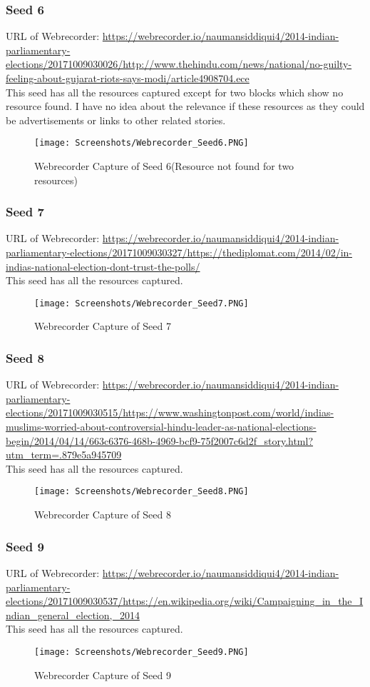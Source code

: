 \documentclass[11pt,journal,compsoc,onecolumn]{IEEEtran}
\begin{document}
\subsubsection{Seed 6}
URL of Webrecorder: 
\url{https://webrecorder.io/naumansiddiqui4/2014-indian-parliamentary-elections/20171009030026/http://www.thehindu.com/news/national/no-guilty-feeling-about-gujarat-riots-says-modi/article4908704.ece}\\
This seed has all the resources captured except for two blocks which show no resource found. I have no idea about the relevance if these resources as they could be advertisements or links to other related stories. 
 \begin{figure}[ht] 
  \centering
  \texttt{[image: Screenshots/Webrecorder\_Seed6.PNG]}
  \caption{Webrecorder Capture of Seed 6(Resource not found for two resources)}
  \label{fig:9}
\end{figure}
\subsubsection{Seed 7}
URL of Webrecorder: 
\url{https://webrecorder.io/naumansiddiqui4/2014-indian-parliamentary-elections/20171009030327/https://thediplomat.com/2014/02/in-indias-national-election-dont-trust-the-polls/}\\
This seed has all the resources captured.
 \begin{figure}[ht] 
  \centering
  \texttt{[image: Screenshots/Webrecorder\_Seed7.PNG]}
  \caption{Webrecorder Capture of Seed 7}
  \label{fig:10}
\end{figure}
\subsubsection{Seed 8}
URL of Webrecorder: 
\url{https://webrecorder.io/naumansiddiqui4/2014-indian-parliamentary-elections/20171009030515/https://www.washingtonpost.com/world/indias-muslims-worried-about-controversial-hindu-leader-as-national-elections-begin/2014/04/14/663c6376-468b-4969-bcf9-75f2007c6d2f_story.html?utm_term=.879e5a945709}\\
This seed has all the resources captured.
 \begin{figure}[ht] 
  \centering
  \texttt{[image: Screenshots/Webrecorder\_Seed8.PNG]}
  \caption{Webrecorder Capture of Seed 8}
  \label{fig:11}
\end{figure}
\subsubsection{Seed 9}
URL of Webrecorder: 
\url{https://webrecorder.io/naumansiddiqui4/2014-indian-parliamentary-elections/20171009030537/https://en.wikipedia.org/wiki/Campaigning_in_the_Indian_general_election,_2014}\\
This seed has all the resources captured.
 \begin{figure}[ht] 
  \centering
  \texttt{[image: Screenshots/Webrecorder\_Seed9.PNG]}
  \caption{Webrecorder Capture of Seed 9}
  \label{fig:12}
\end{figure}
\end{document}
